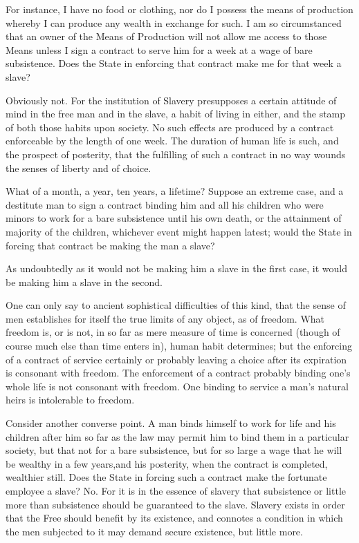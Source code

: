 \documentclass{book}
\begin{document}
For instance, I have no food or clothing, nor do I possess the means of production whereby I can produce any wealth in exchange for such. I am so circumstanced that an owner of the Means of Production will not allow me access to those Means unless I sign a contract to serve him for a week at a wage of bare subsistence. Does the State in enforcing that contract make me for that week a slave?

Obviously not. For the institution of Slavery presupposes a certain attitude of mind in the free man and in the slave, a habit of living in either, and the stamp of both those habits upon society. No such effects are produced by a contract enforceable by the length of one week. The duration of human life is such, and the prospect of posterity, that the fulfilling of such a contract in no way wounds the senses of liberty and of choice.

What of a month, a year, ten years, a lifetime? Suppose an extreme case, and a destitute man to sign a contract binding him and all his children who were minors to work for a bare subsistence until his own death, or the attainment of majority of the children, whichever event might happen latest; would the State in forcing that contract be making the man a slave?

As undoubtedly as it would not be making him a slave in the first case, it would be making him a slave in the second.

One can only say to ancient sophistical difficulties of this kind, that the sense of men establishes for itself the true limits of any object, as of freedom. What freedom is, or is not, in so far as mere measure of time is concerned (though of course much else than time enters in), human habit determines; but the enforcing of a contract of service certainly or probably leaving a choice after its expiration is consonant with freedom. The enforcement of a contract probably binding one’s whole life is not consonant with freedom. One binding to service a man’s natural heirs is intolerable to freedom.

Consider another converse point. A man binds himself to work for life and his children after him so far as the law may permit him to bind them in a particular society, but that not for a bare subsistence, but for so large a wage that he will be wealthy in a few years,and his posterity, when the contract is completed, wealthier still. Does the State in forcing such a contract make the fortunate employee a slave? No. For it is in the essence of slavery that subsistence or little more than subsistence should be guaranteed to the slave. Slavery exists in order that the Free should benefit by its existence, and connotes a condition in which the men subjected to it may demand secure existence, but little more.
\end{document}

